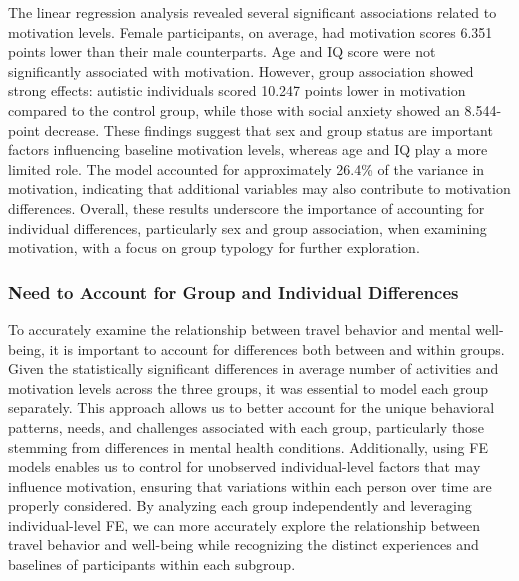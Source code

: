 \documentclass[
  letterpaper,
  number,
  review,
  3p]{elsarticle}
\begin{document}
The linear regression analysis revealed several significant associations
related to motivation levels. Female participants, on average, had
motivation scores 6.351 points lower than their male counterparts. Age
and IQ score were not significantly associated with motivation. However,
group association showed strong effects: autistic individuals scored
10.247 points lower in motivation compared to the control group, while
those with social anxiety showed an 8.544-point decrease. These findings
suggest that sex and group status are important factors influencing
baseline motivation levels, whereas age and IQ play a more limited role.
The model accounted for approximately 26.4\% of the variance in
motivation, indicating that additional variables may also contribute to
motivation differences. Overall, these results underscore the importance
of accounting for individual differences, particularly sex and group
association, when examining motivation, with a focus on group typology
for further exploration.

\subsubsection{Need to Account for Group and Individual
Differences}\label{need-to-account-for-group-and-individual-differences}

To accurately examine the relationship between travel behavior and
mental well-being, it is important to account for differences both
between and within groups. Given the statistically significant
differences in average number of activities and motivation levels across
the three groups, it was essential to model each group separately. This
approach allows us to better account for the unique behavioral patterns,
needs, and challenges associated with each group, particularly those
stemming from differences in mental health conditions. Additionally,
using FE models enables us to control for unobserved individual-level
factors that may influence motivation, ensuring that variations within
each person over time are properly considered. By analyzing each group
independently and leveraging individual-level FE, we can more accurately
explore the relationship between travel behavior and well-being while
recognizing the distinct experiences and baselines of participants
within each subgroup.
\end{document}
